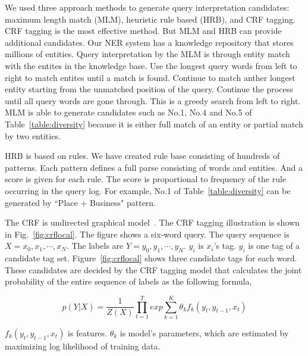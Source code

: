 \documentclass[11pt]{article}
\begin{document}
We used three approach methods to generate query interpretation candidates: maximum length match (MLM), heuristic rule based (HRB), and CRF tagging. CRF tagging is the most effective method. But MLM and HRB can provide additional candidates. Our NER system has a knowledge repository that stores millions of entities. Query interpretation by the MLM is through entity match with the entites in the knowledge base. Use the longest query words from left to right to match entites until a match is found. Continue to match anther longest entity starting from the unmatched position of the query. Continue the process until all query words are gone through.  This is a greedy search from left to right.  MLM is able to generate candidates such as No.1, No.4 and No.5 of Table~\ref{table:diversity} because it is either full match of an entity or partial match by two entities. 

HRB is based on rules. We have created rule base consisting of hundreds of patterns. Each pattern defines a full parse consisting of words and entities. And a score is given for each rule. The score is proportional to frequency of the rule occurring in the query log.  For example, No.1 of Table~\ref{table:diversity} can be generated by ``Place + Business" pattern. 

The CRF is undirected graphical model~\cite{lafferty:2001}.  The CRF tagging illustration is shown in Fig.~\ref{fig:crflocal}. The figure shows a six-word query. The query sequence is $X={x_0,x_1,\cdots,x_N}$. The labels are $Y={y_0,y_1,\cdots,y_N}$.  $y_i$ is $x_i$'s tag. $y_{i}$ is one tag of a candidate tag set. Figure~\ref{fig:crflocal} shows three  candidate tags for each word.  These candidates are decided by the
CRF tagging model that calculates  the joint probability of the entire sequence of labels as the  following formula,

\begin{equation}
p(Y|X)=\frac{1}{Z(X)}\prod_{t=1}^{T}exp{\sum_{k=1}^{K}\theta_{k}f_{k}(y_{t},y_{t-1},x_{t})}
\label{eq:crf}
\end{equation}

$f_{k}(y_{t},y_{t-1},x_{t})$ is features. $\theta_{k}$ is model's parameters, which are estimated by maximizing log likelihood of training data.
\end{document}
